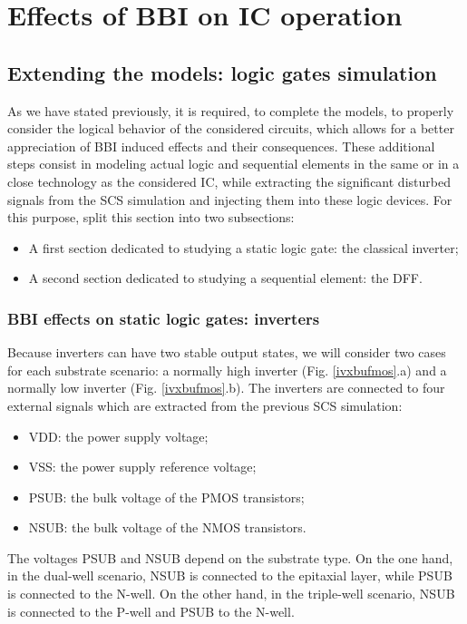 
\section{Effects of BBI on IC operation}
\subsection{Extending the models: logic gates simulation}
	As we have stated previously, it is required, to complete the models, to properly consider the logical behavior of the considered circuits, which allows for a better appreciation of BBI induced effects and their consequences.
	These additional steps consist in modeling actual logic and sequential elements in the same or in a close technology as the considered IC, while extracting the significant disturbed signals from the SCS simulation and injecting them into these logic devices.
	For this purpose, split this section into two subsections:
	\begin{itemize}
		\item A first section dedicated to studying a static logic gate: the classical inverter;
		\item A second section dedicated to studying a sequential element: the DFF.
	\end{itemize}

	\subsubsection{BBI effects on static logic gates: inverters}
		
		Because inverters can have two stable output states, we will consider two cases for each substrate scenario: a normally high inverter (Fig. \ref{ivxbufmos}.a) and a normally low inverter (Fig. \ref{ivxbufmos}.b).
		The inverters are connected to four external signals which are extracted from the previous SCS simulation:
		\begin{itemize}
				\item VDD: the power supply voltage;
				\item VSS: the power supply reference voltage;
				\item PSUB: the bulk voltage of the PMOS transistors;
				\item NSUB: the bulk voltage of the NMOS transistors.
			\end{itemize}
		The voltages PSUB and NSUB depend on the substrate type.
		On the one hand, in the dual-well scenario, NSUB is connected to the epitaxial layer, while PSUB is connected to the N-well.
		On the other hand, in the triple-well scenario, NSUB is connected to the P-well and PSUB to the N-well.

